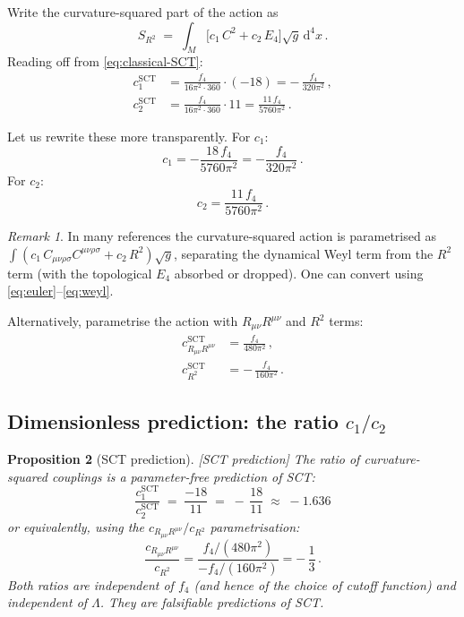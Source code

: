 \documentclass[12pt,a4paper]{article}
\newtheorem{proposition}{Proposition}[section]
\theoremstyle{definition}
\theoremstyle{remark}
\newtheorem{remark}[proposition]{Remark}
\newcommand{\Ricsq}{R_{\mu\nu}R^{\mu\nu}}
\newcommand{\Weylsq}{C_{\mu\nu\rho\sigma}C^{\mu\nu\rho\sigma}}
\newcommand{\dd}{\mathrm{d}}
\newcommand{\sctpred}{\textcolor{purple!80!black}{\textsf{[SCT prediction]}}}
\begin{document}
Write the curvature-squared part of the action as
\begin{equation}
  S_{R^2} \;=\; \int_M \bigl[c_1\, C^2 + c_2\, E_4\bigr]
  \sqrt{g}\,\dd^4 x\,.
  \label{eq:R2-general}
\end{equation}
Reading off from \eqref{eq:classical-SCT}:
\begin{align}
  c_1^{\mathrm{SCT}}
  &= \frac{f_4}{16\pi^2\cdot 360}\cdot(-18)
   = -\,\frac{f_4}{320\pi^2}\,,
  \label{eq:c1}\\[6pt]
  c_2^{\mathrm{SCT}}
  &= \frac{f_4}{16\pi^2\cdot 360}\cdot 11
   = \frac{11\,f_4}{5760\pi^2}\,.
  \label{eq:c2}
\end{align}

Let us rewrite these more transparently.  For $c_1$:
\[
  c_1 = -\frac{18\,f_4}{5760\pi^2} = -\frac{f_4}{320\pi^2}\,.
\]
For $c_2$:
\[
  c_2 = \frac{11\,f_4}{5760\pi^2}\,.
\]

\begin{remark}
In many references the curvature-squared action is parametrised as
$\int(c_1\,\Weylsq + c_2\,R^2)\sqrt{g}$, separating the dynamical
Weyl term from the $R^2$ term (with the topological $E_4$ absorbed or
dropped).  One can convert using \eqref{eq:euler}--\eqref{eq:weyl}.
\end{remark}

Alternatively, parametrise the action with
$\Ricsq$ and $R^2$ terms:
\begin{align}
  c_{\Ricsq}^{\mathrm{SCT}}
  &= \frac{f_4}{480\pi^2}\,,
  \label{eq:c-Ric}\\[4pt]
  c_{R^2}^{\mathrm{SCT}}
  &= -\,\frac{f_4}{160\pi^2}\,.
  \label{eq:c-R2}
\end{align}


\subsection{Dimensionless prediction: the ratio \texorpdfstring{$c_1/c_2$}{c1/c2}}

\begin{proposition}[SCT prediction]
\sctpred\;
The ratio of curvature-squared couplings is a
\emph{parameter-free prediction} of SCT:
\begin{equation}
  \boxed{
  \frac{c_1^{\mathrm{SCT}}}{c_2^{\mathrm{SCT}}}
  \;=\;
  \frac{-18}{11}
  \;=\;
  -\,\frac{18}{11}
  \;\approx\; -1.636
  }
  \label{eq:ratio-prediction}
\end{equation}
or equivalently, using the $c_{\Ricsq}/c_{R^2}$ parametrisation:
\begin{equation}
  \frac{c_{\Ricsq}}{c_{R^2}}
  = \frac{f_4/(480\pi^2)}{-f_4/(160\pi^2)}
  = -\,\frac{1}{3}\,.
  \label{eq:ratio-Ric}
\end{equation}
Both ratios are independent of $f_4$ (and hence of the choice of
cutoff function) and independent of $\Lambda$.  They are
\emph{falsifiable predictions} of SCT.
\end{proposition}
\end{document}
